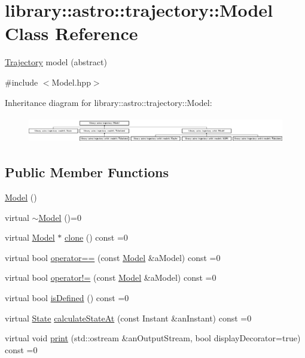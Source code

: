 \hypertarget{classlibrary_1_1astro_1_1trajectory_1_1_model}{}\section{library\+:\+:astro\+:\+:trajectory\+:\+:Model Class Reference}
\label{classlibrary_1_1astro_1_1trajectory_1_1_model}


\hyperlink{classlibrary_1_1astro_1_1_trajectory}{Trajectory} model (abstract)  




{\ttfamily \#include $<$Model.\+hpp$>$}

Inheritance diagram for library\+:\+:astro\+:\+:trajectory\+:\+:Model\+:\begin{figure}[H]
\begin{center}
\leavevmode
\includegraphics[height=1.166667cm]{classlibrary_1_1astro_1_1trajectory_1_1_model}
\end{center}
\end{figure}
\subsection*{Public Member Functions}
\begin{DoxyCompactItemize}
\item 
\hyperlink{classlibrary_1_1astro_1_1trajectory_1_1_model_a083bde3f2c8d3d1406220ad3e2dd9cd9}{Model} ()
\item 
virtual \hyperlink{classlibrary_1_1astro_1_1trajectory_1_1_model_abd305caa6adde24bf7ee2eb93e0639d1}{$\sim$\+Model} ()=0
\item 
virtual \hyperlink{classlibrary_1_1astro_1_1trajectory_1_1_model}{Model} $\ast$ \hyperlink{classlibrary_1_1astro_1_1trajectory_1_1_model_ad6181e14aea57534897e7446a2a27578}{clone} () const =0
\item 
virtual bool \hyperlink{classlibrary_1_1astro_1_1trajectory_1_1_model_a83c52eb23e8feea58d600c87700ed923}{operator==} (const \hyperlink{classlibrary_1_1astro_1_1trajectory_1_1_model}{Model} \&a\+Model) const =0
\item 
virtual bool \hyperlink{classlibrary_1_1astro_1_1trajectory_1_1_model_a476c234f5fca1eb75f64f5a96fd83c61}{operator!=} (const \hyperlink{classlibrary_1_1astro_1_1trajectory_1_1_model}{Model} \&a\+Model) const =0
\item 
virtual bool \hyperlink{classlibrary_1_1astro_1_1trajectory_1_1_model_a9b55db62f22c3493313661bacd9f7c1b}{is\+Defined} () const =0
\item 
virtual \hyperlink{classlibrary_1_1astro_1_1trajectory_1_1_state}{State} \hyperlink{classlibrary_1_1astro_1_1trajectory_1_1_model_acee9ee770c2ee1d1205b618e8f722ba4}{calculate\+State\+At} (const Instant \&an\+Instant) const =0
\item 
virtual void \hyperlink{classlibrary_1_1astro_1_1trajectory_1_1_model_af3dd0c38fdbac0b64f689fd8c88c3320}{print} (std\+::ostream \&an\+Output\+Stream, bool display\+Decorator=true) const =0
\end{DoxyCompactItemize}
